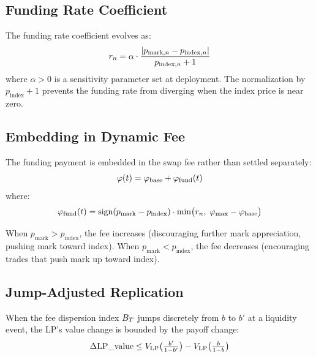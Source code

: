 \subsection{Funding Rate Coefficient}

\begin{definition}\label{def:funding-rate}
The funding rate coefficient evolves as:
\begin{equation}\label{eq:funding-rate-evolution}
  r_n = \alpha \cdot \frac{|p_{\text{mark},n} - p_{\text{index},n}|}{p_{\text{index},n} + 1}
\end{equation}
where $\alpha > 0$ is a sensitivity parameter set at deployment.
The normalization by $p_{\text{index}} + 1$ prevents the funding rate from
diverging when the index price is near zero.
\end{definition}

\subsection{Embedding in Dynamic Fee}

The funding payment is embedded in the swap fee rather than settled separately:
\begin{equation}\label{eq:dynamic-fee}
  \varphi(t) = \varphi_{\text{base}} + \varphi_{\text{fund}}(t)
\end{equation}
where:
\begin{equation}\label{eq:funding-fee-component}
  \varphi_{\text{fund}}(t) = \text{sign}(p_{\text{mark}} - p_{\text{index}}) \cdot
  \min\bigl(r_n,\; \varphi_{\max} - \varphi_{\text{base}}\bigr)
\end{equation}

When $p_{\text{mark}} > p_{\text{index}}$, the fee increases (discouraging further
mark appreciation, pushing mark toward index). When $p_{\text{mark}} < p_{\text{index}}$,
the fee decreases (encouraging trades that push mark up toward index).

\subsection{Jump-Adjusted Replication}

\begin{theorem}\label{thm:jump-safety}
When the fee dispersion index $B_T$ jumps discretely from $b$ to $b'$ at a
liquidity event, the LP's value change is bounded by the payoff change:
\begin{equation}\label{eq:jump-bound}
  \Delta\text{LP\_value} \leq V_{\mathrm{LP}}\bigl(\tfrac{b'}{1-b'}\bigr) - V_{\mathrm{LP}}\bigl(\tfrac{b}{1-b}\bigr)
\end{equation}
\end{theorem}

